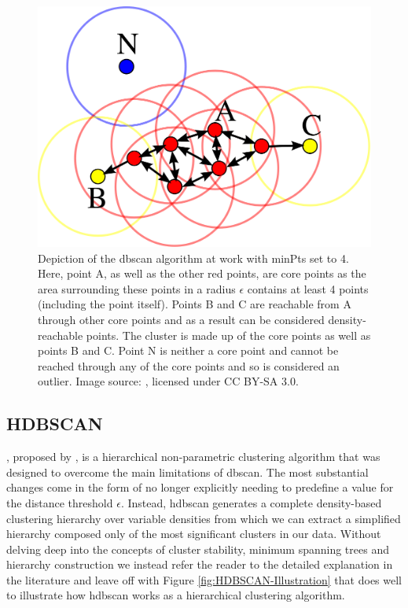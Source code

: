 \begin{figure}[H]
    \centering
    \includegraphics[width=\textwidth]{Images/Chapter 3/DBSCAN/DBSCAN-Illustration.png}
    \caption{Depiction of the \gls{dbscan} algorithm at work with minPts set to 4. Here, point A, as well as the other red points, are core points as the area surrounding these points in a radius $\epsilon$ contains at least 4 points (including the point itself). Points B and C are reachable from A through other core points and as a result can be considered density-reachable points. The cluster is made up of the core points as well as points B and C. Point N is neither a core point and cannot be reached through any of the core points and so is considered an outlier. Image source: \cite{Wikipedia_DBSCAN}, licensed under CC BY-SA 3.0.}
    \label{fig:DBSCAN-Illustration}
\end{figure}

\subsection{HDBSCAN}
\label{subsec:Background-Information:Clustering-Algorithms:HDBSCAN}
, proposed by \citet{Campello}, is a hierarchical non-parametric clustering algorithm that was designed to overcome the main limitations of \gls{dbscan}. The most substantial changes come in the form of no longer explicitly needing to predefine a value for the distance threshold $\epsilon$. Instead, \gls{hdbscan} generates a complete density-based clustering hierarchy over variable densities from which we can extract a simplified hierarchy composed only of the most significant clusters in our data. Without delving deep into the concepts of cluster stability, minimum spanning trees and hierarchy construction we instead refer the reader to the detailed explanation in the literature \cite{Campello} and leave off with Figure \ref{fig:HDBSCAN-Illustration} that does well to illustrate how \gls{hdbscan} works as a hierarchical clustering algorithm.

